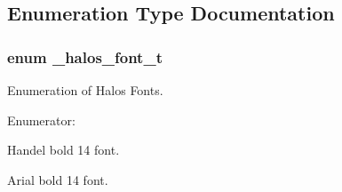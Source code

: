 \subsection{Enumeration Type Documentation}
\hypertarget{group__hgdi__fonts_g00f868edeb5f757b072d265ae951ab3a}{
\subsubsection[{\_\-halos\_\-font\_\-t}]{\setlength{\rightskip}{0pt plus 5cm}enum {\bf \_\-halos\_\-font\_\-t}}}
\label{group__hgdi__fonts_g00f868edeb5f757b072d265ae951ab3a}


Enumeration of Halos Fonts. 

\begin{Desc}
\item[Enumerator: ]\par
\begin{description}
\item[{\em 
\hypertarget{group__hgdi__fonts_gg00f868edeb5f757b072d265ae951ab3a885578c504898ecc5c89f1ebdd265f79}{
HANDEL\_\-BOLD\_\-14}
\label{group__hgdi__fonts_gg00f868edeb5f757b072d265ae951ab3a885578c504898ecc5c89f1ebdd265f79}
}]Handel bold 14 font. \item[{\em 
\hypertarget{group__hgdi__fonts_gg00f868edeb5f757b072d265ae951ab3a06baaacffbceaa684aac2bad0bc97c1a}{
ARIAL\_\-BOLD\_\-14}
\label{group__hgdi__fonts_gg00f868edeb5f757b072d265ae951ab3a06baaacffbceaa684aac2bad0bc97c1a}
}]Arial bold 14 font. \end{description}
\end{Desc}

